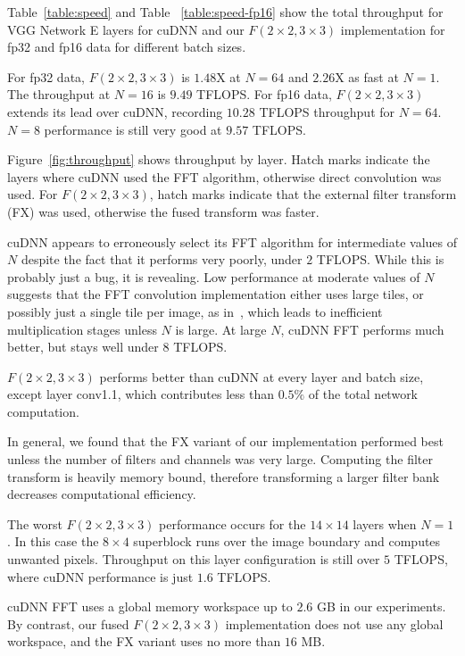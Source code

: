 \documentclass[10pt,twocolumn,letterpaper]{article}
\begin{document}
Table~\ref{table:speed} and Table ~\ref{table:speed-fp16} show the total throughput for VGG Network E layers for cuDNN and our $F(2\times 2, 3\times 3)$ implementation for fp32 and fp16 data for different batch sizes. 

For fp32 data, $F(2\times 2, 3\times 3)$ is $1.48$X at $N=64$ and $2.26$X as fast at $N=1$. The throughput at $N=16$ is $9.49$ TFLOPS. For fp16 data, $F(2\times 2, 3\times 3)$ extends its lead over cuDNN, recording $10.28$ TFLOPS throughput for $N=64$. $N=8$ performance is still very good at $9.57$ TFLOPS.

Figure~\ref{fig:throughput} shows throughput by layer. Hatch marks indicate the layers where cuDNN used the FFT algorithm, otherwise direct convolution was used. For $F(2\times 2, 3\times 3)$, hatch marks indicate that the external filter transform (FX) was used, otherwise the fused transform was faster.

cuDNN appears to erroneously select its FFT algorithm for intermediate values of $N$ despite the fact that it performs very poorly, under $2$ TFLOPS. While this is probably just a bug, it is revealing. Low performance at moderate values of $N$  suggests that the FFT convolution implementation either uses large tiles, or possibly just a single tile per image, as in~\cite{DBLP:journals/corr/VasilacheJMCPL14}, which leads to inefficient multiplication stages unless $N$ is large. At large $N$, cuDNN FFT performs much better, but stays well under $8$ TFLOPS.

$F(2\times 2, 3\times 3)$ performs better than cuDNN at every layer and batch size, except layer conv1.1, which contributes less than $0.5\%$ of the total network computation.

In general, we found that the FX variant of our implementation performed best unless the number of filters and channels was very large. Computing the filter transform is heavily memory bound, therefore transforming a larger filter bank decreases computational efficiency.

The worst $F(2\times 2, 3\times 3)$ performance occurs for the $14 \times 14$ layers when $N=1$. In this case the $8\times 4$ superblock runs over the image boundary and computes unwanted pixels. Throughput on this layer configuration is still over $5$ TFLOPS, where cuDNN performance is just $1.6$ TFLOPS.

cuDNN FFT uses a global memory workspace up to $2.6$ GB in our experiments. By contrast, our fused $F(2 \times 2, 3 \times 3)$ implementation does not use any global workspace, and the FX variant uses no more than $16$ MB.
\end{document}
